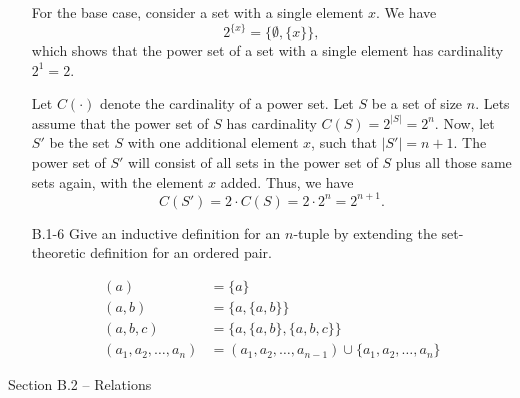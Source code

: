 \documentclass{report}
\makeatletter
\renewenvironment{framed}{%
 \def\FrameCommand##1{\hskip\@totalleftmargin
 \fboxsep=\FrameSep\fbox{##1}}%
 \MakeFramed {\advance\hsize-\width
   \@totalleftmargin\z@ \linewidth\hsize
   \@setminipage}}%
 {\par\unskip\endMakeFramed}
\makeatother
\begin{document}
\begin{enumerate}
\begin{framed}
For the base case, consider a set with a single element $x$. We have
\[
  2^{\{x\}} = \{\emptyset, \{x\}\},
\]
which shows that the power set of a set with a single element has cardinality
$2^1 = 2$.

Let $C(\cdot)$ denote the cardinality of a power set. Let $S$ be a set of size
$n$. Lets assume that the power set of $S$ has cardinality
$C(S) = 2^{|S|} = 2^n$. Now, let $S'$ be the set $S$ with one additional element
$x$, such that $|S'| = n + 1$. The power set of $S'$ will consist of all sets
in the power set of $S$ plus all those same sets again, with the element $x$
added. Thus, we have
\[
  C(S') = 2 \cdot C(S) = 2 \cdot 2^n = 2^{n + 1}.
\]
\end{framed}

\item[B.1{-}6]{Give an inductive definition for an $n$-tuple by extending the
set-theoretic definition for an ordered pair.}

\begin{framed}
\begin{equation*}
\begin{aligned}
  (a) &= \{a\}\\
  (a, b) &= \{a, \{a, b\}\}\\
  (a, b, c) &= \{a, \{a, b\}, \{a, b, c\}\}\\
  (a_1, a_2, \dots, a_n) &= (a_1, a_2, \dots, a_{n - 1}) \cup \{a_1, a_2, \dots, a_n\}
\end{aligned}
\end{equation*}
\end{framed}

\end{enumerate}

\newpage

{\large Section B.2 {--} Relations}
\end{document}
